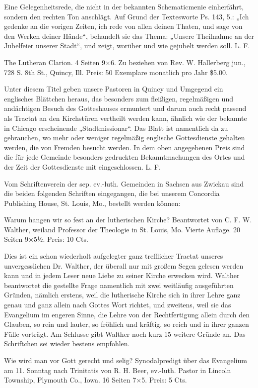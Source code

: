 Eine Gelegenheitsrede, die nicht in der bekannten Schematicmenie einherfährt, sondern den rechten Ton anschlägt. Auf Grund der Textesworte Ps. 143, 5.: „Ich gedenke an die vorigen Zeiten, ich rede von allen deinen Thaten, und sage von den Werken deiner Hände“, behandelt sie das Thema: „Unsere Theilnahme an der Jubelfeier unserer Stadt“, und zeigt, worüber und wie gejubelt werden soll. L. F.

The Lutheran Clarion. 4 Seiten 9×6. Zu beziehen von Rev. W. Hallerberg jun., 728 S. 8th St., Quincy, Ill. Preis: 50 Exemplare monatlich pro Jahr \$5.00.

Unter diesem Titel geben unsere Pastoren in Quincy und Umgegend ein englisches Blättchen heraus, das besonders zum fleißigen, regelmäßigen und andächtigen Besuch des Gotteshauses ermuntert und darum auch recht passend als Tractat an den Kirchstüren vertheilt werden kann, ähnlich wie der bekannte in Chicago erscheinende „Stadtmissionar“. Das Blatt ist namentlich da zu gebrauchen, wo mehr oder weniger regelmäßig englische Gottesdienste gehalten werden, die von Fremden besucht werden. In dem oben angegebenen Preis sind die für jede Gemeinde besonders gedruckten Bekanntmachungen des Ortes und der Zeit der Gottesdienste mit eingeschlossen. L. F.

Vom Schriftenverein der sep. ev.-luth. Gemeinden in Sachsen aus Zwickau sind die beiden folgenden Schriften eingegangen, die bei unserem Concordia Publishing House, St. Louis, Mo., bestellt werden können:

Warum hangen wir so fest an der lutherischen Kirche? Beantwortet von C. F. W. Walther, weiland Professor der Theologie in St. Louis, Mo. Vierte Auflage. 20 Seiten 9×5½. Preis: 10 Cts.

Dies ist ein schon wiederholt aufgelegter ganz trefflicher Tractat unseres unvergesslichen Dr. Walther, der überall nur mit großem Segen gelesen werden kann und in jedem Leser neue Liebe zu seiner Kirche erwecken wird. Walther beantwortet die gestellte Frage namentlich mit zwei weitläufig ausgeführten Gründen, nämlich erstens, weil die lutherische Kirche sich in ihrer Lehre ganz genau und ganz allein nach Gottes Wort richtet, und zweitens, weil sie das Evangelium im engeren Sinne, die Lehre von der Rechtfertigung allein durch den Glauben, so rein und lauter, so fröhlich und kräftig, so reich und in ihrer ganzen Fülle vorträgt. Am Schlusse gibt Walther noch kurz 15 weitere Gründe an. Das Schriftchen sei wieder bestens empfohlen.

Wie wird man vor Gott gerecht und selig? Synodalpredigt über das Evangelium am 11. Sonntag nach Trinitatis von R. H. Beer, ev.-luth. Pastor in Lincoln Township, Plymouth Co., Iowa. 16 Seiten 7×5. Preis: 5 Cts.

